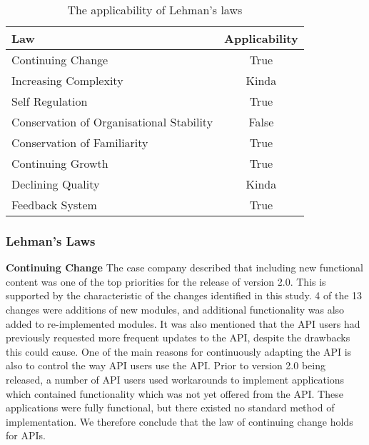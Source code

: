 \documentclass{sig-alternate}
\begin{document}
\begin{table}
       \centering
       \begin{tabular}[ht]{l|c}
              \toprule

              \textbf{Law}                              & \textbf{Applicability}    \\ \midrule
              Continuing Change                         & True                      \\ \hline
              Increasing Complexity                     & Kinda                     \\ \hline
              Self Regulation                           & True                      \\ \hline
              Conservation of Organisational Stability  & False                     \\ \hline
              Conservation of Familiarity               & True                      \\ \hline
              Continuing Growth                         & True                      \\ \hline
              Declining Quality                         & Kinda                     \\ \hline
              Feedback System                           & True                      \\ 

              \bottomrule

       \end{tabular}
       \caption{The applicability of Lehman's laws}
       \label{table:lehman}
\end{table}


\subsubsection{Lehman's Laws}

\smallskip \noindent
\textbf{Continuing Change} 
The case company described that including new functional content was one of the top priorities for the release of version 2.0. This is supported by the characteristic of the changes identified in this study. 4 of the 13 changes were additions of new modules, and additional functionality was also added to re-implemented modules. It was also mentioned that the API users had previously requested more frequent updates to the API, despite the drawbacks this could cause. One of the main reasons for continuously adapting the API is also to control the way API users use the API. Prior to version 2.0 being released, a number of API users used workarounds to implement applications which contained functionality which was not yet offered from the API. These applications were fully functional, but there existed no standard method of implementation. We therefore conclude that the law of continuing change holds for APIs. 
\end{document}
